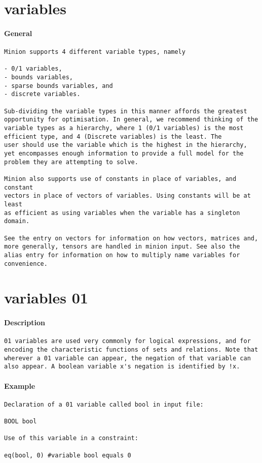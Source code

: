 \section{variables}
\paragraph{General}
{\footnotesize
\begin{verbatim}
Minion supports 4 different variable types, namely

- 0/1 variables,
- bounds variables,
- sparse bounds variables, and
- discrete variables.

Sub-dividing the variable types in this manner affords the greatest
opportunity for optimisation. In general, we recommend thinking of the
variable types as a hierarchy, where 1 (0/1 variables) is the most
efficient type, and 4 (Discrete variables) is the least. The
user should use the variable which is the highest in the hierarchy,
yet encompasses enough information to provide a full model for the
problem they are attempting to solve.

Minion also supports use of constants in place of variables, and constant
vectors in place of vectors of variables. Using constants will be at least
as efficient as using variables when the variable has a singleton domain.

See the entry on vectors for information on how vectors, matrices and,
more generally, tensors are handled in minion input. See also the
alias entry for information on how to multiply name variables for
convenience.
\end{verbatim}
}
\section{variables 01}
\paragraph{Description}
{\footnotesize
\begin{verbatim}
01 variables are used very commonly for logical expressions, and for
encoding the characteristic functions of sets and relations. Note that
wherever a 01 variable can appear, the negation of that variable can
also appear. A boolean variable x's negation is identified by !x.
\end{verbatim}
}
\paragraph{Example}
{\footnotesize
\begin{verbatim}
Declaration of a 01 variable called bool in input file:

BOOL bool

Use of this variable in a constraint:

eq(bool, 0) #variable bool equals 0
\end{verbatim}
}
